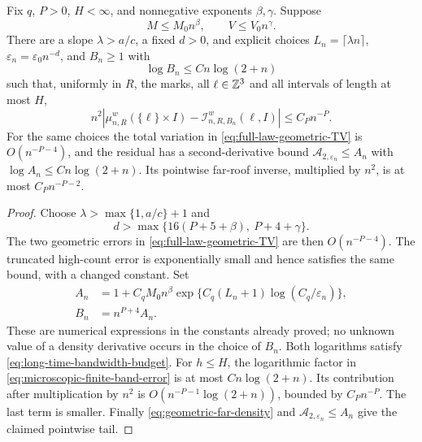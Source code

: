 \begin{corollary}
\label{cor:linear-cutoff-microscopic-inversion}
Fix $q$, $P>0$, $H<\infty$, and nonnegative exponents $\beta,\gamma$.
Suppose
\[
 M\le M_0 n^\beta,\qquad V\le V_0 n^\gamma.
\]
There are a slope $\lambda>a/c$, a fixed $d>0$, and explicit choices
$L_n=\lceil\lambda n\rceil$, $\varepsilon_n=\varepsilon_0 n^{-d}$,
and $B_n\ge1$ with
\begin{equation}\label{eq:long-time-bandwidth-budget}
 \log B_n\le C n\log(2+n)
\end{equation}
such that, uniformly in $R$, the marks, all $\ell\in\mathbb Z^3$ and all
intervals of length at most $H$,
\begin{equation}\label{eq:microscopic-uniform-inversion}
 n^2\left|\mu_{n,R}^w(\{\ell\}\times I)
                    -\mathcal I_{n,R,B_n}^{w}(\ell,I)\right|
       \le C_P n^{-P}.
\end{equation}
For the same choices the total variation in
\eqref{eq:full-law-geometric-TV} is $O(n^{-P-4})$, and the residual
has a second-derivative bound $\mathcal A_{2,\varepsilon_n}\le A_n$
with $\log A_n\le C n\log(2+n)$. Its pointwise far-roof inverse,
multiplied by $n^2$, is at most $C_Pn^{-P-2}$.
\end{corollary}
\begin{proof}
Choose $\lambda>\max\{1,a/c\}+1$ and
\[
 d>\max\{16(P+5+\beta),\ P+4+\gamma\}.
\]
The two geometric errors in \eqref{eq:full-law-geometric-TV} are then
$O(n^{-P-4})$. The truncated high-count error is exponentially small
and hence satisfies the same bound, with a changed constant. Set
\begin{equation}\label{eq:explicit-long-time-bandwidth}
 \begin{split}
 A_n&=1+C_qM_0 n^\beta
           \exp\{C_q(L_n+1)\log(C_q/\varepsilon_n)\},\\
 B_n&=n^{P+4}A_n.
 \end{split}
\end{equation}
These are numerical expressions in the constants already proved; no
unknown value of a density derivative occurs in the choice of $B_n$.
Both logarithms satisfy \eqref{eq:long-time-bandwidth-budget}.
For $h\le H$, the logarithmic factor in
\eqref{eq:microscopic-finite-band-error} is at most $C n\log(2+n)$.
Its contribution after multiplication by $n^2$ is
$O(n^{-P-1}\log(2+n))$, bounded by $C_Pn^{-P}$. The last term is
smaller. Finally \eqref{eq:geometric-far-density} and
$\mathcal A_{2,\varepsilon_n}\le A_n$ give the claimed pointwise tail.
\end{proof}

